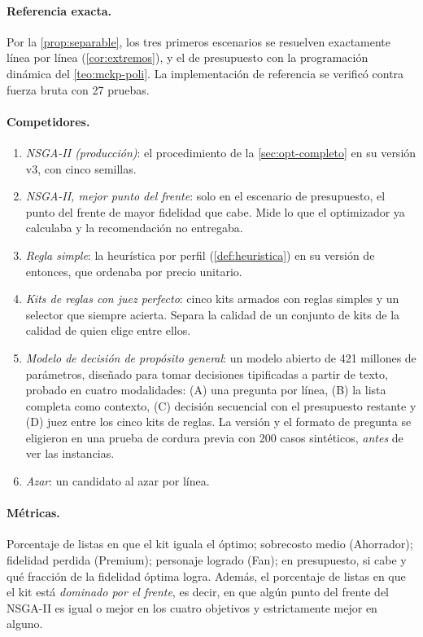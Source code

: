 \paragraph{Referencia exacta.} Por la \cref{prop:separable}, los tres primeros
escenarios se resuelven exactamente línea por línea
(\cref{cor:extremos}), y el de presupuesto con la programación dinámica del
\cref{teo:mckp-poli}. La implementación de referencia se verificó contra
fuerza bruta con 27 pruebas.

\paragraph{Competidores.}
\begin{enumerate}
  \item \emph{NSGA-II (producción)}: el procedimiento de la
        \cref{sec:opt-completo} en su versión v3, con cinco semillas.
  \item \emph{NSGA-II, mejor punto del frente}: solo en el escenario de
        presupuesto, el punto del frente de mayor fidelidad que cabe. Mide lo
        que el optimizador ya calculaba y la recomendación no entregaba.
  \item \emph{Regla simple}: la heurística por perfil
        (\cref{def:heuristica}) en su versión de entonces, que ordenaba por
        precio unitario.
  \item \emph{Kits de reglas con juez perfecto}: cinco kits armados con reglas
        simples y un selector que siempre acierta. Separa la calidad de un
        conjunto de kits de la calidad de quien elige entre ellos.
  \item \emph{Modelo de decisión de propósito general}: un modelo abierto de
        421 millones de parámetros, diseñado para tomar decisiones
        tipificadas a partir de texto, probado en cuatro modalidades: (A) una
        pregunta por línea, (B) la lista completa como contexto, (C) decisión
        secuencial con el presupuesto restante y (D) juez entre los cinco kits
        de reglas. La versión y el formato de pregunta se eligieron en una
        prueba de cordura previa con 200 casos sintéticos, \emph{antes} de ver
        las instancias.
  \item \emph{Azar}: un candidato al azar por línea.
\end{enumerate}

\paragraph{Métricas.} Porcentaje de listas en que el kit iguala el óptimo;
sobrecosto medio (Ahorrador); fidelidad perdida (Premium); personaje logrado
(Fan); en presupuesto, si cabe y qué fracción de la fidelidad óptima logra.
Además, el porcentaje de listas en que el kit está \emph{dominado por el
frente}, es decir, en que algún punto del frente del NSGA-II es igual o mejor
en los cuatro objetivos y estrictamente mejor en alguno.

